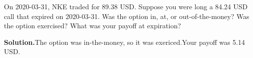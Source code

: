 \noindent On 2020-03-31, NKE traded for 89.38 USD. Suppose you were long a 84.24 USD call that expired on 2020-03-31. Was the option in, at, or out-of-the-money? Was the option exercised? What was your payoff at expiration?

\vspace{9pt} 

\textbf{Solution.}The option was in-the-money, so it was exericed.Your payoff was 5.14 USD.
